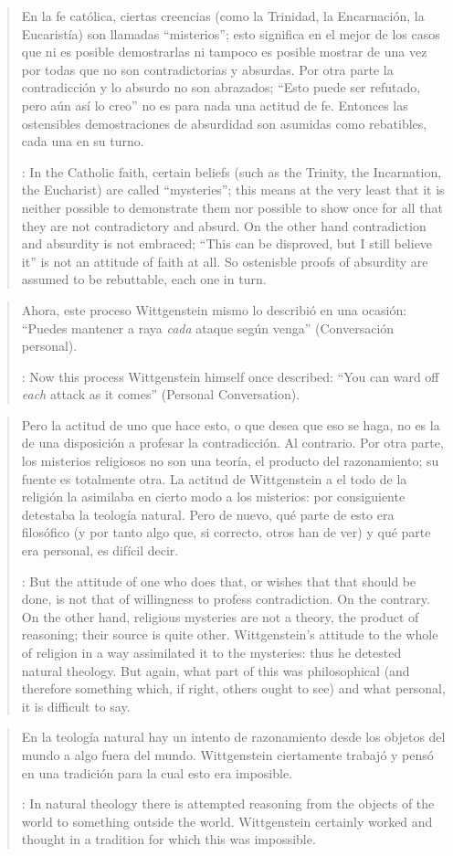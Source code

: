 \blockquote[{\cite[122]{anscombe1981parmenides:qli}}: In the Catholic faith, certain beliefs (such as the Trinity, the Incarnation, the Eucharist) are called ``mysteries''; this means at the very least that it is neither possible to demonstrate them nor possible to show once for all that they are not contradictory and absurd. On the other hand contradiction and absurdity is not embraced; ``This can be disproved, but I still believe it'' is not an attitude of faith at all. So ostenisble proofs of absurdity are assumed to be rebuttable, each one in turn.]{En la fe católica, ciertas creencias (como la Trinidad, la Encarnación, la Eucaristía) son llamadas ``misterios''; esto significa en el mejor de los casos que ni es posible demostrarlas ni tampoco es posible mostrar de una vez por todas que no son contradictorias y absurdas. Por otra parte la contradicción y lo absurdo no son abrazados; ``Esto puede ser refutado, pero aún así lo creo'' no es para nada una actitud de fe. Entonces las ostensibles demostraciones de absurdidad son asumidas como rebatibles, cada una en su turno.}

\blockquote[{\cite[122]{anscombe1981parmenides:qli}}: Now this process Wittgenstein himself once described: ``You can ward off \emph{each} attack as it comes'' (Personal Conversation).]{Ahora, este proceso Wittgenstein mismo lo describió en una ocasión: ``Puedes mantener a raya \emph{cada} ataque según venga'' (Conversación personal).}

\blockquote[{\cite[122--123]{anscombe1981parmenides:qli}}: But the attitude of one who does that, or wishes that that should be done, is not that of willingness to profess contradiction. On the contrary. On the other hand, religious mysteries are not a theory, the product of reasoning; their source is quite other. Wittgenstein's attitude to the whole of religion in a way assimilated it to the mysteries: thus he detested natural theology. But again, what part of this was philosophical (and therefore something which, if right, others ought to see) and what personal, it is difficult to say.]{Pero la actitud de uno que hace esto, o que desea que eso se haga, no es la de una disposición a profesar la contradicción. Al contrario. Por otra parte, los misterios religiosos no son una teoría, el producto del razonamiento; su fuente es totalmente otra. La actitud de Wittgenstein a el todo de la religión la asimilaba en cierto modo a los misterios: por consiguiente detestaba la teología natural. Pero de nuevo, qué parte de esto era filosófico (y por tanto algo que, si correcto, otros han de ver) y qué parte era personal, es difícil decir.}

\blockquote[{\cite[123]{anscombe1981parmenides:qli}}: In natural theology there is attempted reasoning from the objects of the world to something outside the world. Wittgenstein certainly worked and thought in a tradition for which this was impossible.]{En la teología natural hay un intento de razonamiento desde los objetos del mundo a algo fuera del mundo. Wittgenstein ciertamente trabajó y pensó en una tradición para la cual esto era imposible.}
